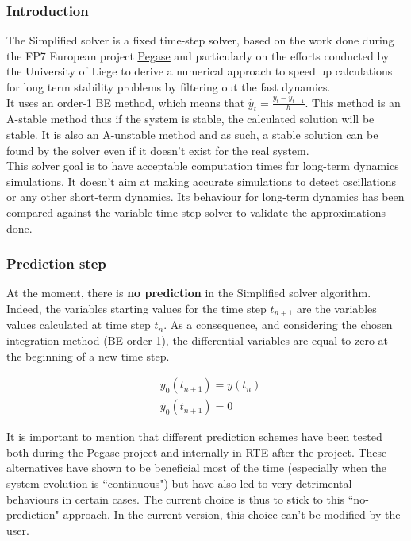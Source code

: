 \documentclass[a4paper, 12pt]{report}
\begin{document}
\subsubsection{Introduction}

The Simplified solver is a fixed time-step solver, based on the work done during the FP7 European project \href{http://www.fp7-pegase.com/}{\underline{Pegase}} and particularly on the efforts conducted by the University of Liege to derive a numerical approach to speed up calculations for long term stability problems by filtering out the fast dynamics. \\

It uses an order-1 \ac{BE} method, which means that $\dot{y_t} = \frac{y_t - y_{t-1}}{h}$. This method is an A-stable method thus if the system is stable, the calculated solution will be stable. It is also an A-unstable method and as such, a stable solution can be found by the solver even if it doesn't exist for the real system. \\

This solver goal is to have acceptable computation times for long-term dynamics simulations. It doesn't aim at making accurate simulations to detect oscillations or any other short-term dynamics. Its behaviour for long-term dynamics has been compared against the variable time step solver to validate the approximations done. \\

\subsubsection{Prediction step}

At the moment, there is \textbf{no prediction} in the Simplified solver  algorithm. Indeed, the variables starting values for the time step $t_{n+1}$ are the variables values calculated at time step $t_n$. As a consequence, and considering the chosen integration method (\ac{BE} order 1), the differential variables are equal to zero at the beginning of a new time step.

\begin{equation}
\begin{aligned}
& y_0(t_{n+1}) = y(t_n) \\
& \dot{y_0}(t_{n+1}) = 0
\end{aligned}
\end{equation}

It is important to mention that different prediction schemes have been tested both during the Pegase project and internally in RTE after the project. These alternatives have shown to be beneficial most of the time (especially when the system evolution is ``continuous") but have also led to very detrimental behaviours in certain cases. The current choice is thus to stick to this ``no-prediction" approach. In the current version, this choice can't be modified by the user.
\end{document}
